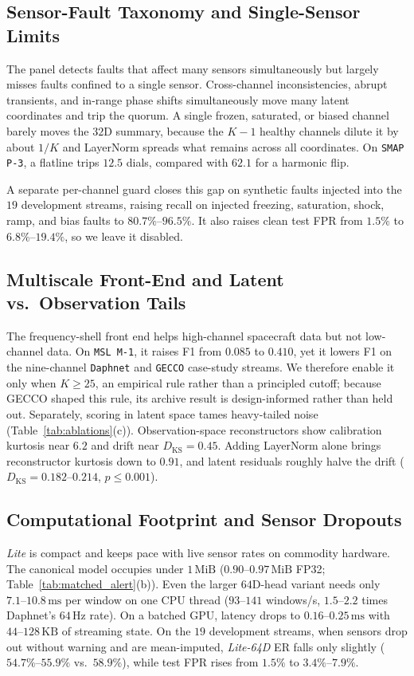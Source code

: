 \subsection{Sensor-Fault Taxonomy and Single-Sensor Limits}
\label{subsec:gating_ablation}
The panel detects faults that affect many sensors simultaneously but largely misses faults confined to a single sensor. Cross-channel inconsistencies, abrupt transients, and in-range phase shifts simultaneously move many latent coordinates and trip the quorum. A single frozen, saturated, or biased channel barely moves the $32$D summary, because the $K-1$ healthy channels dilute it by about $1/K$ and LayerNorm spreads what remains across all coordinates. On \texttt{SMAP P-3}, a flatline trips $12.5$ dials, compared with $62.1$ for a harmonic flip.

A separate per-channel guard closes this gap on synthetic faults injected into the $19$ development streams, raising recall on injected freezing, saturation, shock, ramp, and bias faults to $80.7\%\text{--}96.5\%$. It also raises clean test FPR from $1.5\%$ to $6.8\%\text{--}19.4\%$, so we leave it disabled.

\subsection{Multiscale Front-End and Latent vs.\ Observation Tails}
\label{subsec:dyadic_ablation}
\label{subsec:controlled_backbone}
The frequency-shell front end helps high-channel spacecraft data but not low-channel data. On \texttt{MSL M-1}, it raises F1 from $0.085$ to $0.410$, yet it lowers F1 on the nine-channel \texttt{Daphnet} and \texttt{GECCO} case-study streams. We therefore enable it only when $K \ge 25$, an empirical rule rather than a principled cutoff; because GECCO shaped this rule, its archive result is design-informed rather than held out. Separately, scoring in latent space tames heavy-tailed noise (Table~\ref{tab:ablations}(c)). Observation-space reconstructors show calibration kurtosis near $6.2$ and drift near $D_{\text{KS}}=0.45$. Adding LayerNorm alone brings reconstructor kurtosis down to $0.91$, and latent residuals roughly halve the drift ($D_{\text{KS}}=0.182\text{--}0.214$, $p\le 0.001$).

\subsection{Computational Footprint and Sensor Dropouts}
\label{subsec:computational_deployment}
\emph{Lite} is compact and keeps pace with live sensor rates on commodity hardware. The canonical model occupies under $1\,\text{MiB}$ ($0.90\text{--}0.97\,\text{MiB}$ FP32; Table~\ref{tab:matched_alert}(b)). Even the larger $64$D-head variant needs only $7.1\text{--}10.8\,\text{ms}$ per window on one CPU thread ($93\text{--}141$ windows/s, $1.5\text{--}2.2$ times Daphnet's $64\,\text{Hz}$ rate). On a batched GPU, latency drops to $0.16\text{--}0.25\,\text{ms}$ with $44\text{--}128\,\text{KB}$ of streaming state. On the $19$ development streams, when sensors drop out without warning and are mean-imputed, \emph{Lite-64D} ER falls only slightly ($54.7\%\text{--}55.9\%$ vs.\ $58.9\%$), while test FPR rises from $1.5\%$ to $3.4\%\text{--}7.9\%$.
